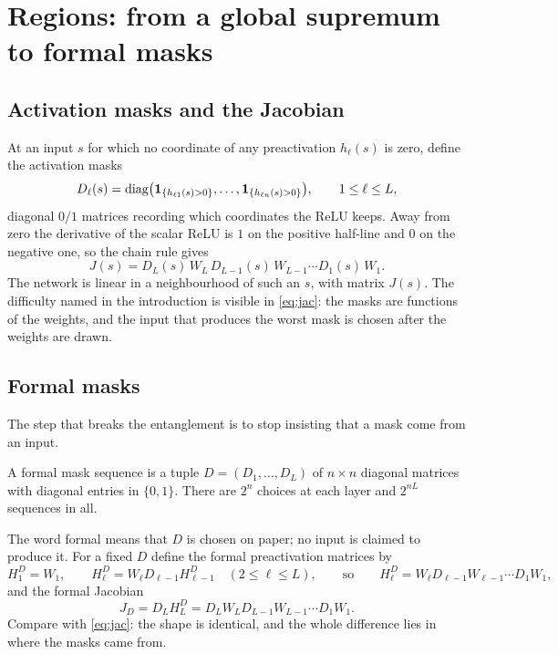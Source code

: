 \section{Regions: from a global supremum to formal masks}
\label{sec:regions}

\subsection{Activation masks and the Jacobian}

At an input $s$ for which no coordinate of any preactivation $h_\ell(s)$ is zero, define the activation masks
\[
D_\ell(s)=\operatorname{diag}\bigl(\mathbf{1}_{\{h_{\ell 1}(s)>0\}},\dots,\mathbf{1}_{\{h_{\ell n}(s)>0\}}\bigr),\qquad 1\le\ell\le L,
\]
diagonal $0/1$ matrices recording which coordinates the ReLU keeps. Away from zero the derivative of the scalar ReLU is $1$ on the positive half-line and $0$ on the negative one, so the chain rule gives
\begin{equation}\label{eq:jac}
J(s)=D_L(s)\,W_L\,D_{L-1}(s)\,W_{L-1}\cdots D_1(s)\,W_1 .
\end{equation}
The network is linear in a neighbourhood of such an $s$, with matrix $J(s)$. The difficulty named in the introduction is visible in \cref{eq:jac}: the masks are functions of the weights, and the input that produces the worst mask is chosen after the weights are drawn.

\subsection{Formal masks}

The step that breaks the entanglement is to stop insisting that a mask come from an input.

\begin{definition}
A formal mask sequence is a tuple $D=(D_1,\dots,D_L)$ of $n\times n$ diagonal matrices with diagonal entries in $\{0,1\}$. There are $2^n$ choices at each layer and $2^{nL}$ sequences in all.
\end{definition}

The word formal means that $D$ is chosen on paper; no input is claimed to produce it. For a fixed $D$ define the formal preactivation matrices by
\begin{equation}\label{eq:HD}
H^D_1=W_1,\qquad H^D_\ell=W_\ell D_{\ell-1}H^D_{\ell-1}\quad(2\le\ell\le L),\qquad\text{so}\qquad H^D_\ell=W_\ell D_{\ell-1}W_{\ell-1}\cdots D_1W_1,
\end{equation}
and the formal Jacobian
\begin{equation}\label{eq:JD}
J_D=D_LH^D_L=D_LW_LD_{L-1}W_{L-1}\cdots D_1W_1 .
\end{equation}
Compare with \cref{eq:jac}: the shape is identical, and the whole difference lies in where the masks came from.

